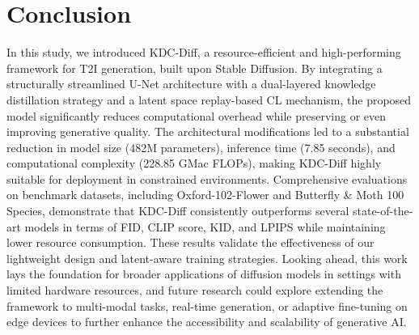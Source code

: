 \documentclass[a4paper,fleqn]{ieeetj}
\begin{document}



\section{Conclusion}
In this study, we introduced KDC-Diff, a resource-efficient and high-performing framework for T2I generation, built upon Stable Diffusion. By integrating a structurally streamlined U-Net architecture with a dual-layered knowledge distillation strategy and a latent space replay-based CL mechanism, the proposed model significantly reduces computational overhead while preserving or even improving generative quality. The architectural modifications led to a substantial reduction in model size (482M parameters), inference time (7.85 seconds), and computational complexity (228.85 GMac FLOPs), making KDC-Diff highly suitable for deployment in constrained environments. Comprehensive evaluations on benchmark datasets, including Oxford-102-Flower and Butterfly \& Moth 100 Species, demonstrate that KDC-Diff consistently outperforms several state-of-the-art models in terms of FID, CLIP score, KID, and LPIPS while maintaining lower resource consumption. These results validate the effectiveness of our lightweight design and latent-aware training strategies. Looking ahead, this work lays the foundation for broader applications of diffusion models in settings with limited hardware resources, and future research could explore extending the framework to multi-modal tasks, real-time generation, or adaptive fine-tuning on edge devices to further enhance the accessibility and scalability of generative AI.
\end{document}
